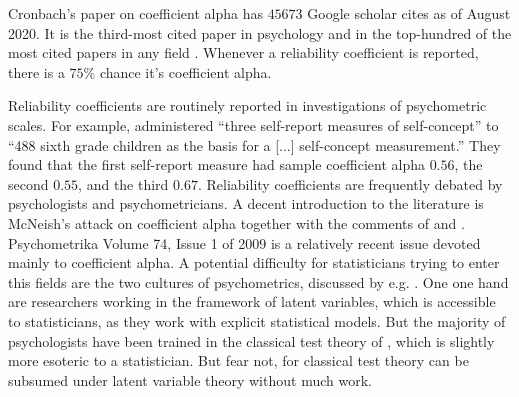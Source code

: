 Cronbach's \citeyear{Cronbach1951-in} paper on coefficient alpha has $45673$ Google scholar cites as of August 2020. It is the third-most cited paper in psychology and in the top-hundred of the most cited papers in any field \parencite{McNeish2018-vu}. Whenever a reliability coefficient is reported, there is a $75\%$ chance it's coefficient alpha.

Reliability coefficients are routinely reported in investigations of psychometric scales. For example, \textcite{Marx1978-rf} administered \enquote{three self-report measures of self-concept} to \enquote{488 sixth grade children as the basis for a [...] self-concept measurement.} They found that the first self-report measure had sample coefficient alpha $0.56$, the second $0.55$, and the third $0.67$. 
Reliability coefficients are frequently debated by psychologists and psychometricians. A decent introduction to the literature is McNeish's \citeyear{McNeish2018-vu} attack on coefficient alpha together with the comments of \textcite{Raykov2019-yr} and \textcite{Savalei2019-se}. Psychometrika Volume 74, Issue 1 of 2009 is a relatively recent issue devoted mainly to coefficient alpha. A potential difficulty for statisticians trying to enter this fields are the two cultures of psychometrics, discussed by e.g. \textcite{Borsboom2005-iq}. One one hand are researchers working in the framework of latent variables, which is accessible to statisticians, as they work with explicit statistical models. But the majority of psychologists have been trained in the classical test theory of \textcite{Lord1968-ax}, which is slightly more esoteric to a statistician. But fear not, for classical test theory can be subsumed under latent variable theory without much work.


